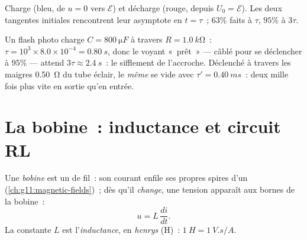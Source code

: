 \begin{omfigure}

{\small Charge (bleu, de $u = 0$ vers $\mathcal{E}$) et décharge
(rouge, depuis $U_0 = \mathcal{E}$). Les deux tangentes initiales
rencontrent leur asymptote en $t = \tau$~; $63\%$ faits à $\tau$,
$95\%$ à $3\tau$.}
\end{omfigure}

\begin{example}\label{ex:g12:rc-rl-circuits:flashrc}
Un flash photo charge $C = \qty{800}{\micro F}$ à travers
$R = \qty{1.0}{k\ohm}$~: $\tau = 10^3 \times 8.0\times10^{-4} =
\qty{0.80}{s}$, donc le voyant «~prêt~» --- câblé pour se déclencher
à $95\%$ --- attend $3\tau \approx \qty{2.4}{s}$~: le sifflement de
l'accroche. Déclenché à travers les maigres \qty{0.50}{\ohm} du tube
éclair, le \emph{même}  se vide avec
$\tau' = \qty{0.40}{ms}$~: deux mille fois plus vite en sortie qu'en
entrée.
\end{example}

\section{La bobine~: inductance et circuit RL}

\begin{definition}\label{def:g12:rc-rl-circuits:inductor}
Une \emph{bobine} est un
 de fil~: son courant enfile ses propres spires
d'un 
(\cref{ch:g11:magnetic-fields})~; dès qu'il \emph{change}, une
tension apparaît aux bornes de la
bobine~:
\[
u = L\,\frac{di}{dt} .
\]
La constante $L$ est l'\emph{inductance}, en
\emph{henrys} (\unit{H})~: $\qty{1}{H} = \qty{1}{V.s/A}$.
\end{definition}
\admitted

